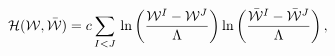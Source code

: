 \begin{equation} {\cal H}({\cal
W}, \bar{\cal W}) = c\sum_{I<J}\, \ln \left({{\cal W}^{I}-{\cal
W}^{J}\over \Lambda}\right) \ln \left({\bar{\cal W}^{I}-\bar{\cal
W}^{J}\over \Lambda}\right),\label{1}
\end{equation}

